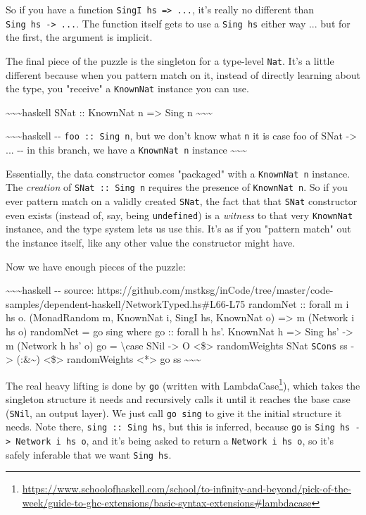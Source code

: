 \documentclass[]{article}
\renewcommand{\href}[2]{#2\footnote{\url{#1}}}
\begin{document}
So if you have a function \texttt{SingI\ hs\ =\textgreater{}\ ...}, it's really
no different than \texttt{Sing\ hs\ -\textgreater{}\ ...}. The function itself
gets to use a \texttt{Sing\ hs} either way ... but for the first, the argument
is implicit.

The final piece of the puzzle is the singleton for a type-level \texttt{Nat}.
It's a little different because when you pattern match on it, instead of
directly learning about the type, you "receive" a \texttt{KnownNat} instance you
can use.

\textasciitilde{}\textasciitilde{}\textasciitilde{}haskell SNat :: KnownNat n
=\textgreater{} Sing n \textasciitilde{}\textasciitilde{}\textasciitilde{}

\textasciitilde{}\textasciitilde{}\textasciitilde{}haskell -\/-
\texttt{foo\ ::\ Sing\ n}, but we don't know what \texttt{n} it is case foo of
SNat -\textgreater{} ... -\/- in this branch, we have a \texttt{KnownNat\ n}
instance \textasciitilde{}\textasciitilde{}\textasciitilde{}

Essentially, the data constructor comes "packaged" with a \texttt{KnownNat\ n}
instance. The \emph{creation} of \texttt{SNat\ ::\ Sing\ n} requires the
presence of \texttt{KnownNat\ n}. So if you ever pattern match on a validly
created \texttt{SNat}, the fact that that \texttt{SNat} constructor even exists
(instead of, say, being \texttt{undefined}) is a \emph{witness} to that very
\texttt{KnownNat} instance, and the type system lets us use this. It's as if you
"pattern match" out the instance itself, like any other value the constructor
might have.

Now we have enough pieces of the puzzle:

\textasciitilde{}\textasciitilde{}\textasciitilde{}haskell -\/- source:
https://github.com/mstksg/inCode/tree/master/code-samples/dependent-haskell/NetworkTyped.hs\#L66-L75
randomNet :: forall m i hs o. (MonadRandom m, KnownNat i, SingI hs, KnownNat o)
=\textgreater{} m (Network i hs o) randomNet = go sing where go :: forall h hs'.
KnownNat h =\textgreater{} Sing hs' -\textgreater{} m (Network h hs' o) go =
\textbackslash{}case SNil -\textgreater{} O \textless{}\$\textgreater{}
randomWeights SNat \texttt{SCons} ss -\textgreater{} (:\&\textasciitilde{})
\textless{}\$\textgreater{} randomWeights \textless{}*\textgreater{} go ss
\textasciitilde{}\textasciitilde{}\textasciitilde{}

The real heavy lifting is done by \texttt{go} (written with
\href{https://www.schoolofhaskell.com/school/to-infinity-and-beyond/pick-of-the-week/guide-to-ghc-extensions/basic-syntax-extensions\#lambdacase}{LambdaCase}),
which takes the singleton structure it needs and recursively calls it until it
reaches the base case (\texttt{SNil}, an output layer). We just call
\texttt{go\ sing} to give it the initial structure it needs. Note there,
\texttt{sing\ ::\ Sing\ hs}, but this is inferred, because \texttt{go} is
\texttt{Sing\ hs\ -\textgreater{}\ Network\ i\ hs\ o}, and it's being asked to
return a \texttt{Network\ i\ hs\ o}, so it's safely inferable that we want
\texttt{Sing\ hs}.
\end{document}
